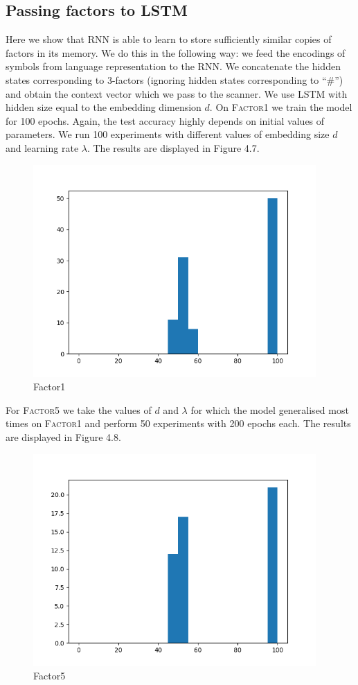 \documentclass[titlepage]{report}
\begin{document}
\subsection{Passing factors to LSTM}

Here we show that RNN is able to learn to store sufficiently similar copies of factors in its memory. We do this in the following way: we feed the encodings of symbols from language representation to the RNN. We concatenate the hidden states corresponding to 3-factors (ignoring hidden states corresponding to ``\#'') and obtain the context vector which we pass to the scanner. We use LSTM with hidden size equal to the embedding dimension $d$. On \textsc{Factor1} we train the model for 100 epochs. Again, the test accuracy highly depends on initial values of parameters. We run 100 experiments with different values of embedding size $d$ and learning rate $\lambda$. The results are displayed in Figure 4.7.

\begin{figure}[H]
\centering
\includegraphics[width = 108mm]{figures/histograms/factor1/manual/10-01}
\caption{Factor1}
\end{figure}

\noindent
For \textsc{Factor5} we take the values of $d$ and $\lambda$ for which the model generalised most times on \textsc{Factor1} and perform 50 experiments with 200 epochs each. The results are displayed in Figure 4.8.

\begin{figure}[H]
\centering
\includegraphics[width = 108mm]{figures/histograms/factor5/manual/10-01}
\caption{Factor5}
\end{figure}
\end{document}
